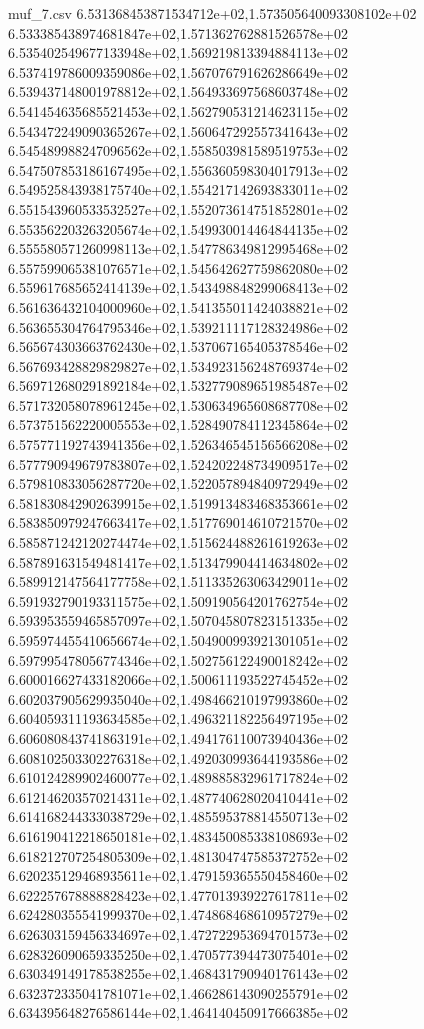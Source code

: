 \begin{filecontents*}{muf_7.csv}
6.531368453871534712e+02,1.573505640093308102e+02
6.533385438974681847e+02,1.571362762881526578e+02
6.535402549677133948e+02,1.569219813394884113e+02
6.537419786009359086e+02,1.567076791626286649e+02
6.539437148001978812e+02,1.564933697568603748e+02
6.541454635685521453e+02,1.562790531214623115e+02
6.543472249090365267e+02,1.560647292557341643e+02
6.545489988247096562e+02,1.558503981589519753e+02
6.547507853186167495e+02,1.556360598304017913e+02
6.549525843938175740e+02,1.554217142693833011e+02
6.551543960533532527e+02,1.552073614751852801e+02
6.553562203263205674e+02,1.549930014464844135e+02
6.555580571260998113e+02,1.547786349812995468e+02
6.557599065381076571e+02,1.545642627759862080e+02
6.559617685652414139e+02,1.543498848299068413e+02
6.561636432104000960e+02,1.541355011424038821e+02
6.563655304764795346e+02,1.539211117128324986e+02
6.565674303663762430e+02,1.537067165405378546e+02
6.567693428829829827e+02,1.534923156248769374e+02
6.569712680291892184e+02,1.532779089651985487e+02
6.571732058078961245e+02,1.530634965608687708e+02
6.573751562220005553e+02,1.528490784112345864e+02
6.575771192743941356e+02,1.526346545156566208e+02
6.577790949679783807e+02,1.524202248734909517e+02
6.579810833056287720e+02,1.522057894840972949e+02
6.581830842902639915e+02,1.519913483468353661e+02
6.583850979247663417e+02,1.517769014610721570e+02
6.585871242120274474e+02,1.515624488261619263e+02
6.587891631549481417e+02,1.513479904414634802e+02
6.589912147564177758e+02,1.511335263063429011e+02
6.591932790193311575e+02,1.509190564201762754e+02
6.593953559465857097e+02,1.507045807823151335e+02
6.595974455410656674e+02,1.504900993921301051e+02
6.597995478056774346e+02,1.502756122490018242e+02
6.600016627433182066e+02,1.500611193522745452e+02
6.602037905629935040e+02,1.498466210197993860e+02
6.604059311193634585e+02,1.496321182256497195e+02
6.606080843741863191e+02,1.494176110073940436e+02
6.608102503302276318e+02,1.492030993644193586e+02
6.610124289902460077e+02,1.489885832961717824e+02
6.612146203570214311e+02,1.487740628020410441e+02
6.614168244333038729e+02,1.485595378814550713e+02
6.616190412218650181e+02,1.483450085338108693e+02
6.618212707254805309e+02,1.481304747585372752e+02
6.620235129468935611e+02,1.479159365550458460e+02
6.622257678888828423e+02,1.477013939227617811e+02
6.624280355541999370e+02,1.474868468610957279e+02
6.626303159456334697e+02,1.472722953694701573e+02
6.628326090659335250e+02,1.470577394473075401e+02
6.630349149178538255e+02,1.468431790940176143e+02
6.632372335041781071e+02,1.466286143090255791e+02
6.634395648276586144e+02,1.464140450917666385e+02

\end{filecontents*}
